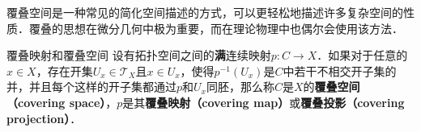 

覆叠空间是一种常见的简化空间描述的方式，可以更轻松地描述许多复杂空间的性质．覆叠的思想在微分几何中极为重要，而在理论物理中也偶尔会使用该方法．

\begin{definition}{覆叠映射和覆叠空间}
设有拓扑空间之间的\textbf{满}连续映射$p:C\rightarrow X$．如果对于任意的$x\in X$，存在开集$U_x\in\mathcal{T}_X$且$x\in U_x$，使得$p^{-1}(U_x)$是$C$中若干不相交开子集的并，并且每个这样的开子集都通过$p$和$U_x$同胚，那么称$C$是$X$的\textbf{覆叠空间（covering space）}，$p$是其\textbf{覆叠映射（covering map）}或\textbf{覆叠投影（covering projection）}．
\end{definition}

